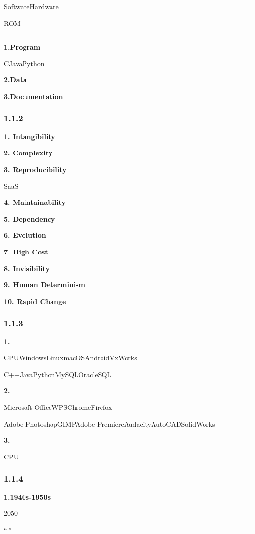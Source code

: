 SoftwareHardware

ROM

\begin{center}\rule{0.5\linewidth}{0.5pt}\end{center}

\textbf{1.Program}

CJavaPython

\textbf{2.Data}

\textbf{3.Documentation}

\subsubsection{1.1.2}\label{section-6}

\textbf{1. Intangibility}

\textbf{2. Complexity}

\textbf{3. Reproducibility}

SaaS

\textbf{4. Maintainability}

\textbf{5. Dependency}

\textbf{6. Evolution}

\textbf{7. High Cost}

\textbf{8. Invisibility}

\textbf{9. Human Determinism}

\textbf{10. Rapid Change}

\subsubsection{1.1.3}\label{section-7}

\textbf{1.}

CPUWindowsLinuxmacOSAndroidVxWorks

C++JavaPythonMySQLOracleSQL

\textbf{2.}

Microsoft OfficeWPSChromeFirefox

Adobe PhotoshopGIMPAdobe PremiereAudacityAutoCADSolidWorks

\textbf{3.}

CPU

\subsubsection{1.1.4}\label{section-8}

\textbf{1.1940s-1950s}

2050

``\,''

